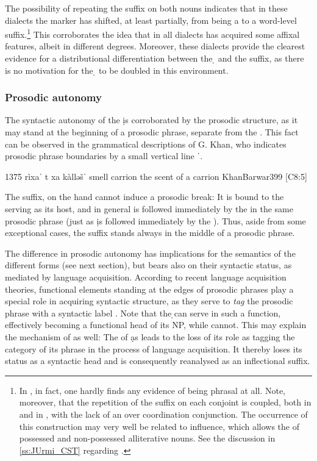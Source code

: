 The possibility of repeating the \ed suffix on both nouns indicates that in these dialects the \ed marker has shifted, at least partially, from being a  to a word-level suffix.\footnote{In \JUrm, in fact, one hardly finds any evidence of \ed being phrasal at all. Note, moreover, that the repetition of the \ed suffix on each conjoint is coupled, both in \Barw and in \JUrm, with the lack of an over coordination conjunction. The occurrence of this construction may very well be related to  influence, which allows the  of possessed and non-possessed alliterative nouns. See the discussion in \ref{ss:JUrmi_CST} regarding .} This corroborates the idea that in all dialects \ed has acquired some affixal features, albeit in different degrees. Moreover, these dialects provide the clearest evidence for a distributional differentiation between the \d {} and the \ed suffix, as there is no motivation for the \d {} to be doubled in this environment. 



\subsubsection{Prosodic autonomy} \label{ss:prosody}

The syntactic autonomy of the \lnk* \d is corroborated by the prosodic structure, as it may stand at the beginning of a prosodic phrase, separate from the \prim. This fact can be observed in the grammatical descriptions of G. Khan, who indicates prosodic phrase boundaries by a small vertical line ˈ.

{1375}
{rìxaˈ t\cb{} xa\cb{} kàlləšˈ}
{smell \lnk\cb{} \indef\cb{} carrion}
{the scent of a carrion}
{KhanBarwar}{399 {[C8:5]}}


 The \ed suffix, on the hand cannot induce a prosodic break: It is bound to the \prim serving as its host, and in general is followed immediately by the \secn in the same prosodic phrase (just as \d is followed immediately by the \secn). Thus, aside from some exceptional cases,  the \ed suffix stands always in the middle of a prosodic phrase. 
 
 The difference in prosodic autonomy has implications for the semantics of the different forms (see next section), but bears also on their syntactic status, as mediated by language acquisition.
According to recent language acquisition theories, functional elements standing at the edges of prosodic phrases play a special role in acquiring syntactic structure, as they serve to \textit{tag} the prosodic phrase with a syntactic label \citep{christophe2008, GutmanBootstrapping}. Note that the \d \lnk* can serve in such a function, effectively becoming a functional head of its NP, while \ed cannot. This may explain the mechanism of  as well: The  of \d  as \ed leads to the loss of its role as tagging the category of its phrase in the process of language acquisition. It thereby loses its status as a syntactic head and is consequently reanalysed as an inflectional suffix. 
 
